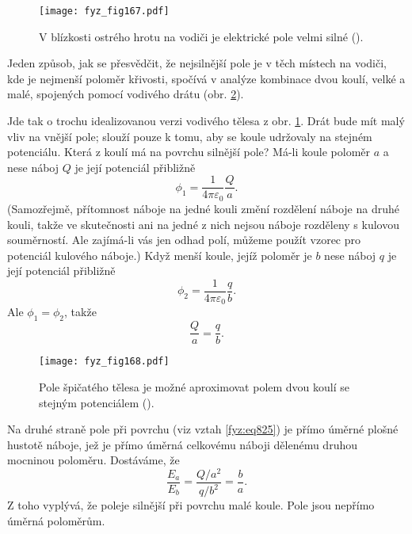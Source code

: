   \begin{figure}[ht!]  %
    \centering
    \texttt{[image: fyz\_fig167.pdf]}
    \caption{V blízkosti ostrého hrotu na vodiči je elektrické pole velmi silné
             (\cite[s.~116]{Feynman02}).}
    \label{fyz:fig167}
  \end{figure}

  Jeden způsob, jak se přesvědčit, že nejsilnější pole je v těch místech na vodiči, kde je nejmenší
  poloměr křivosti, spočívá v analýze kombinace dvou koulí, velké a malé, spojených pomocí vodivého
  drátu (obr. \ref{fyz:fig168}).  

  Jde tak o trochu idealizovanou verzi vodivého tělesa z obr. \ref{fyz:fig167}. Drát bude mít malý
  vliv na vnější pole; slouží pouze k tomu, aby se koule udržovaly na stejném potenciálu. Která z
  koulí má na povrchu silnější pole? Má-li koule poloměr \(a\) a nese náboj \(Q\) je její potenciál
  přibližně
  \begin{equation*}
    ϕ_1=\dfrac{1}{4π\varepsilon_0}\dfrac{Q}{a}.
  \end{equation*}
  (Samozřejmě, přítomnost náboje na jedné kouli změní rozdělení náboje na druhé kouli, takže 
  ve skutečnosti ani na jedné z nich nejsou náboje rozděleny s kulovou souměrností. Ale zajímá-li
  vás jen odhad polí, můžeme použít vzorec pro potenciál kulového náboje.) Když menší koule, jejíž
  poloměr je \(b\) nese náboj \(q\) je její potenciál přibližně
  \begin{equation*}
    ϕ_2=\dfrac{1}{4π\varepsilon_0}\dfrac{q}{b}.
  \end{equation*}
  Ale \(ϕ_1=ϕ_2\), takže
  \begin{equation*}
    \dfrac{Q}{a}=\dfrac{q}{b}.
  \end{equation*}
    
  \begin{figure}[ht!]  %
    \centering
    \texttt{[image: fyz\_fig168.pdf]}
    \caption{Pole špičatého tělesa je možné aproximovat polem dvou koulí se stejným potenciálem
             (\cite[s.~116]{Feynman02}).}
    \label{fyz:fig168}
  \end{figure}

  Na druhé straně pole při povrchu (viz vztah \ref{fyz:eq825}) je přímo úměrné
  plošné hustotě náboje, jež je přímo úměrná celkovému náboji dělenému druhou mocninou poloměru.
  Dostáváme, že
  \begin{equation}\label{fyz:eq826}
    \dfrac{E_a}{E_b}=\dfrac{Q/a^2}{q/b^2}=\dfrac{b}{a}.
  \end{equation}
  Z toho vyplývá, že poleje silnější při povrchu malé koule. Pole jsou nepřímo úměrná poloměrům.

